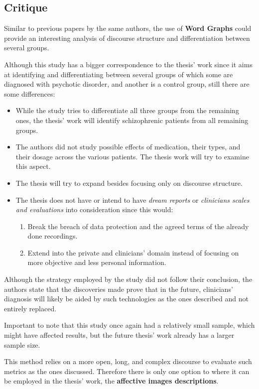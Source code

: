 \documentclass{Paper_Summary}
\begin{document}
\makepapertitle

\breakline

\begin{center}
    \section*{Critique}
\end{center}

    Similar to previous papers by the same authors, the use of \textbf{Word Graphs} could provide an interesting analysis of discourse structure and differentiation between several groups.

    Although this study has a bigger correspondence to the thesis' work since it aims at identifying and differentiating between several groups of which some are diagnosed with psychotic disorder, and another is a control group, still there are some differences:
    \begin{itemize}
        \item While the study tries to differentiate all three groups from the remaining ones, the thesis' work will identify schizophrenic patients from all remaining groups.
        \item The authors did not study possible effects of medication, their types, and their dosage across the various patients. The thesis work will try to examine this aspect.
        \item The thesis will try to expand besides focusing only on discourse structure.
        \item The thesis does not have or intend to have \emph{dream reports} or \emph{clinicians scales and evaluations} into consideration since this would:
        \begin{enumerate}
            \item Break the breach of data protection and the agreed terms of the already done recordings.
            \item Extend into the private and clinicians' domain instead of focusing on more objective and less personal information.
        \end{enumerate}
    \end{itemize}

    Although the strategy employed by the study did not follow their conclusion, the authors state that the discoveries made prove that in the future, clinicians' diagnosis will likely be aided by such technologies as the ones described and not entirely replaced.

    Important to note that this study once again had a relatively small sample, which might have affected results, but the future thesis' work already has a larger sample size.

    This method relies on a more open, long, and complex discourse to evaluate such metrics as the ones discussed. Therefore there is only one option to where it can be employed in the thesis' work, the \textbf{affective images descriptions}.

\breakline
\end{document}

